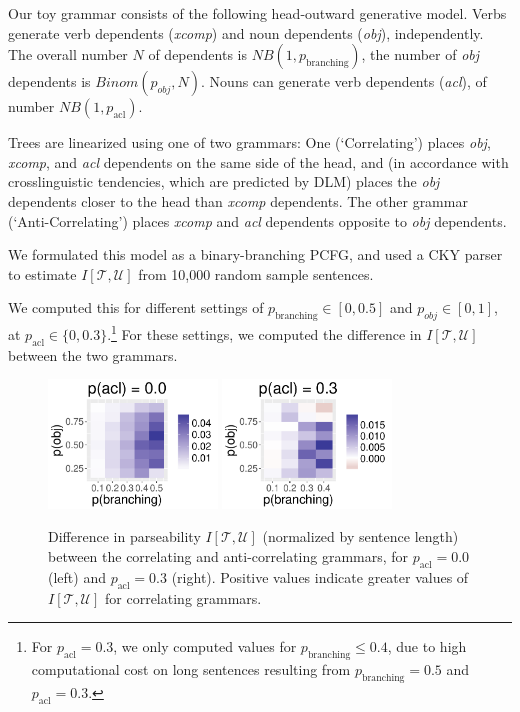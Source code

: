 \documentclass[10pt,twoside,lineno]{article}
\begin{document}
Our toy grammar consists of the following head-outward generative model.
Verbs generate verb dependents (\emph{xcomp}) and noun dependents (\emph{obj}), independently.
The overall number $N$ of dependents is $NB(1, p_\text{branching})$, the number of \emph{obj} dependents is $Binom(p_{obj}, N)$.
Nouns can generate verb dependents (\emph{acl}), of number $NB(1, p_\text{acl})$.

Trees are linearized using one of two grammars: One (`Correlating') places \emph{obj}, \emph{xcomp}, and \emph{acl} dependents on the same side of the head, and (in accordance with crosslinguistic tendencies, which are predicted by DLM) places the \emph{obj} dependents closer to the head than \emph{xcomp} dependents.
The other grammar (`Anti-Correlating') places \emph{xcomp} and \emph{acl} dependents opposite to \emph{obj} dependents.

We formulated this model as a binary-branching PCFG, and used a CKY parser to estimate $I[\mathcal{T}, \mathcal{U}]$ from 10,000 random sample sentences.

We computed this for different settings of $p_\text{branching} \in [0, 0.5]$ and $p_{obj} \in [0,1]$, at $p_\text{acl} \in \{0, 0.3\}$.\footnote{For $p_\text{acl} = 0.3$, we only computed values for $p_\text{branching} \leq 0.4$, due to high computational cost on long sentences resulting from $p_\text{branching} = 0.5$ and $p_\text{acl} = 0.3$.}
For these settings, we computed the difference in $I[\mathcal{T}, \mathcal{U}]$ between the two grammars.

\begin{figure}
	\begin{center}	
\includegraphics[width=0.4\textwidth]{../models/revision/toy_simulations/result_NPBranching0_0.pdf}
\includegraphics[width=0.4\textwidth]{../models/revision/toy_simulations/result_NPBranching0_3.pdf}
\end{center}

	\caption{Difference in parseability $I[\mathcal{T}, \mathcal{U}]$ (normalized by sentence length) between the correlating and anti-correlating grammars, for $p_\text{acl} = 0.0$ (left) and $p_\text{acl} = 0.3$ (right). Positive values indicate greater values of $I[\mathcal{T}, \mathcal{U}]$ for correlating grammars.}\label{fig:toy-parseability}
\end{figure}
\end{document}
